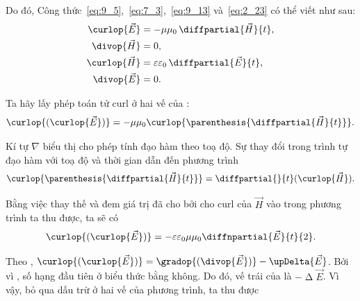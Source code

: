 \noindent
Do đó, Công thức~\eqref{eq:9_5},~\eqref{eq:7_3},~\eqref{eq:9_13} và~\eqref{eq:2_23} có thể viết như sau:
\begin{align}
    \curlop{\vec{E}} &= - \mu\mu_0\, \diffpartial{\vec{H}}{t}, \label{eq:15_1}\\
    \divop{\vec{H}} &= 0, \label{eq:15_2}\\
    \curlop{\vec{H}} &= \varepsilon\varepsilon_0\, \diffpartial{\vec{E}}{t}, \label{eq:15_3}\\
    \divop{\vec{E}} &= 0. \label{eq:15_4}
\end{align}

Ta hãy lấy phép toán tử curl ở hai vế của :
\begin{equation}\label{eq:15_5}
    \curlop{(\curlop{\vec{E}})} = - \mu\mu_0 \curlop{\parenthesis{\diffpartial{\vec{H}}{t}}}.
\end{equation}

\noindent
Kí tự $\nabla$ biểu thị cho phép tính đạo hàm theo toạ độ.
Sự thay đổi trong trình tự đạo hàm với toạ độ và thời gian dẫn đến phương trình
\begin{equation*}
    \curlop{\parenthesis{\diffpartial{\vec{H}}{t}}} = \diffpartial{}{t}(\curlop{\vec{H}}).
\end{equation*}

\noindent
Bằng việc thay thế  và đem giá trị đã cho bởi  cho curl của $\vec{H}$ vào trong phương trình ta thu
được, ta sẽ có
\begin{equation}\label{eq:15_6}
    \curlop{(\curlop{\vec{E}})} = - \varepsilon\varepsilon_0 \mu\mu_0 \diffnpartial{\vec{E}}{t}{2}.
\end{equation}

Theo , $\curlop{(\curlop{\vec{E}})} = \gradop{(\divop{\vec{E}})} - \upDelta{\vec{E}}$.
Bởi vì , số hạng đầu tiên ở biểu thức bằng không.
Do đó, vế trái của  là $-\upDelta{\vec{E}}$.
Vì vậy, bỏ qua dấu trừ ở hai vế của phương trình, ta thu được

